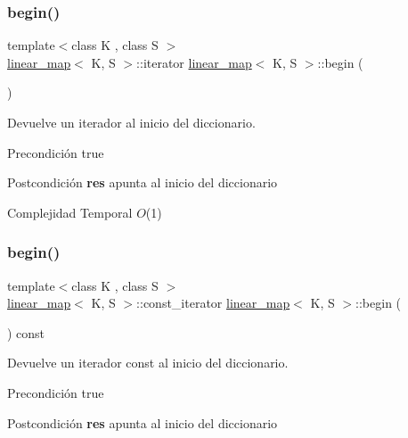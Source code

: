 \subsubsection{\texorpdfstring{begin()}{begin()}\hspace{0.1cm}{\footnotesize\ttfamily [1/2]}}
{\footnotesize\ttfamily template$<$class K , class S $>$ \\
\mbox{\hyperlink{classlinear__map}{linear\+\_\+map}}$<$ K, S $>$\+::iterator \mbox{\hyperlink{classlinear__map}{linear\+\_\+map}}$<$ K, S $>$\+::begin (\begin{DoxyParamCaption}{ }\end{DoxyParamCaption})}



Devuelve un iterador al inicio del diccionario. 

\begin{DoxyPrecond}{Precondición}
true 
\end{DoxyPrecond}
\begin{DoxyPostcond}{Postcondición}
{\bfseries res} apunta al inicio del diccionario
\end{DoxyPostcond}

\begin{DoxyDescription}
\item[Complejidad Temporal]$O$(1)
\end{DoxyDescription}\mbox{\label{classlinear__map_a6f3bef755dbfb788cfe653a3ba70c211}} 
\subsubsection{\texorpdfstring{begin()}{begin()}\hspace{0.1cm}{\footnotesize\ttfamily [2/2]}}
{\footnotesize\ttfamily template$<$class K , class S $>$ \\
\mbox{\hyperlink{classlinear__map}{linear\+\_\+map}}$<$ K, S $>$\+::const\+\_\+iterator \mbox{\hyperlink{classlinear__map}{linear\+\_\+map}}$<$ K, S $>$\+::begin (\begin{DoxyParamCaption}{ }\end{DoxyParamCaption}) const}



Devuelve un iterador const al inicio del diccionario. 

\begin{DoxyPrecond}{Precondición}
true 
\end{DoxyPrecond}
\begin{DoxyPostcond}{Postcondición}
{\bfseries res} apunta al inicio del diccionario
\end{DoxyPostcond}

